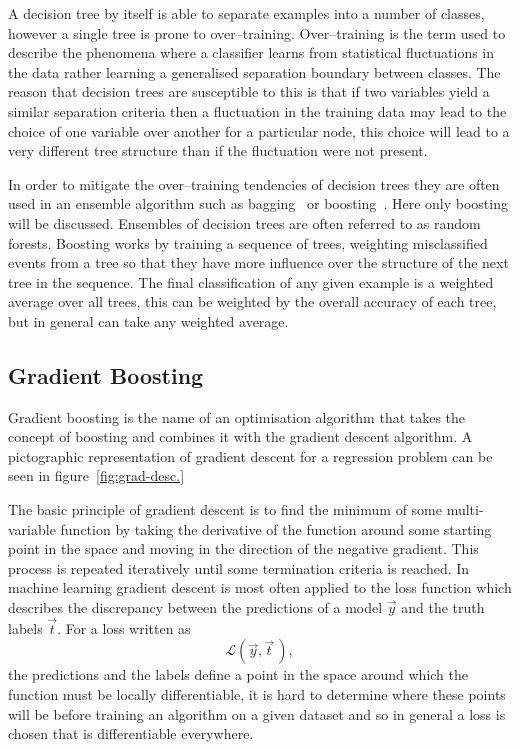A decision tree by itself is able to separate examples into a number of classes,
however a single tree is prone to over--training. Over--training is the term
used to describe the phenomena where a classifier learns from statistical
fluctuations in the data rather learning a generalised separation boundary
between classes. The reason that decision trees are susceptible to this is that
if two variables yield a similar separation criteria then a fluctuation in the
training data may lead to the choice of one variable over another for a
particular node, this choice will lead to a very different tree structure than
if the fluctuation were not present.

In order to mitigate the over--training tendencies of decision trees they are
often used in an ensemble algorithm such as bagging~\cite{bagging}
or boosting~\cite{boosting}. Here only boosting will be discussed. Ensembles of
decision trees are often referred to as random forests. Boosting works by
training a sequence of trees, weighting misclassified events from a tree so that
they have more influence over the structure of the next tree in the sequence.
The final classification of any given example is a weighted average over all
trees, this can be weighted by the overall accuracy of each tree, but in general
can take any weighted average.

\subsection{Gradient Boosting}

Gradient boosting is the name of an optimisation algorithm that takes the
concept of boosting and combines it with the gradient descent algorithm. A
pictographic representation of gradient descent for a regression problem can be
seen in figure~\ref{fig:grad-desc.}

The basic principle of gradient descent is to find the minimum of some
multi-variable function by taking the derivative of the function around some
starting point in the space and moving in the direction of the negative
gradient. This process is repeated iteratively until some termination criteria
is reached. In machine learning gradient descent is most often applied to the
loss function which describes the discrepancy between the predictions of a model
$\vec{y}$ and the truth labels $\vec{t}$. For a loss written as
\begin{equation}
  \mathcal{L}(\vec{y}, \vec{t} \,),
\end{equation}
the predictions and the labels define a point in the space around which the
function must be locally differentiable, it is hard to determine where these
points will be before training an algorithm on a given dataset and so in general
a loss is chosen that is differentiable everywhere.

